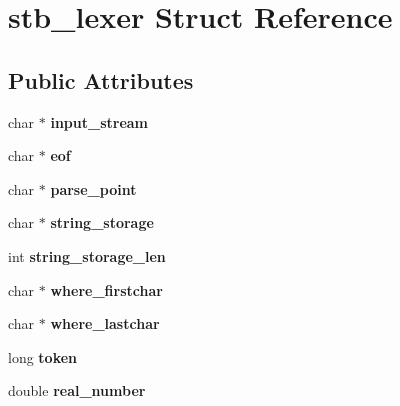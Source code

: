 \hypertarget{structstb__lexer}{}\section{stb\+\_\+lexer Struct Reference}
\label{structstb__lexer}
\subsection*{Public Attributes}
\begin{DoxyCompactItemize}
\item 
char $\ast$ {\bfseries input\+\_\+stream}\hypertarget{structstb__lexer_ae9c8278326ae2f081bf042262fe00bfe}{}\label{structstb__lexer_ae9c8278326ae2f081bf042262fe00bfe}

\item 
char $\ast$ {\bfseries eof}\hypertarget{structstb__lexer_a5dcf4ecad0fc7cfd164dcc56c65a5aa6}{}\label{structstb__lexer_a5dcf4ecad0fc7cfd164dcc56c65a5aa6}

\item 
char $\ast$ {\bfseries parse\+\_\+point}\hypertarget{structstb__lexer_a98328d9d23e36d932c4f27c6fe774eaa}{}\label{structstb__lexer_a98328d9d23e36d932c4f27c6fe774eaa}

\item 
char $\ast$ {\bfseries string\+\_\+storage}\hypertarget{structstb__lexer_a8aea7034b3608aa5a8910c5e13fd9aad}{}\label{structstb__lexer_a8aea7034b3608aa5a8910c5e13fd9aad}

\item 
int {\bfseries string\+\_\+storage\+\_\+len}\hypertarget{structstb__lexer_ac338da9eecdc62cccda3a41d4958a949}{}\label{structstb__lexer_ac338da9eecdc62cccda3a41d4958a949}

\item 
char $\ast$ {\bfseries where\+\_\+firstchar}\hypertarget{structstb__lexer_a8c1f6fcfa749e02912dccce6a9d7df23}{}\label{structstb__lexer_a8c1f6fcfa749e02912dccce6a9d7df23}

\item 
char $\ast$ {\bfseries where\+\_\+lastchar}\hypertarget{structstb__lexer_ab9c5062133145d9b5fedd26f284d4b90}{}\label{structstb__lexer_ab9c5062133145d9b5fedd26f284d4b90}

\item 
long {\bfseries token}\hypertarget{structstb__lexer_afcdc0f31aa0f0ed2d7eeef7262f395da}{}\label{structstb__lexer_afcdc0f31aa0f0ed2d7eeef7262f395da}

\item 
double {\bfseries real\+\_\+number}\hypertarget{structstb__lexer_a143ff6b76ff3a8690e9ed14ff65a136e}{}\label{structstb__lexer_a143ff6b76ff3a8690e9ed14ff65a136e}


\end{DoxyCompactItemize}
